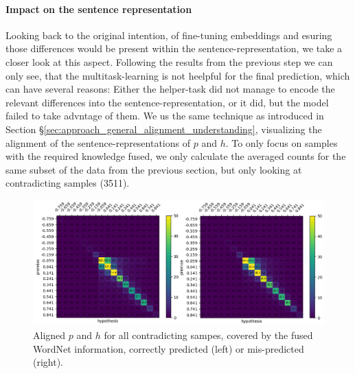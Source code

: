 \paragraph*{Impact on the sentence representation}
Looking back to the original intention, of fine-tuning embeddings and esuring those differences would be present within the sentence-representation, we take a closer look at this aspect. Following the results from the previous step we can only see, that the multitask-learning is not heelpful for the final prediction, which can have several reasons: Either the helper-task did not manage to encode the relevant differences into the sentence-representation, or it did, but the model failed to take advntage of them. We us the same technique as introduced in Section §\ref{sec:approach_general_alignment_understanding}, visualizing the alignment of the sentence-representations of $p$ and $h$. To only focus on samples with the required knowledge fused, we only calculate the averaged counts for the same subset of the data from the previous section, but only looking at contradicting samples (3511).
\begin{figure}[tph!]
\centering
	\includegraphics[totalheight=7cm]{fig/base_correct_incorrect_c.png}
	\caption{Aligned $p$ and $h$ for all contradicting sampes, covered by the fused WordNet information, correctly predicted (left) or mis-predicted (right).}
	\label{fig:base_correct_incorrect_c}
\end{figure}
